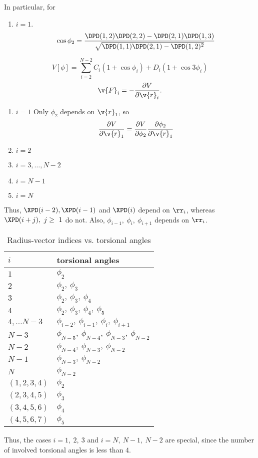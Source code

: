 In particular, for 
\begin{enumerate}
  \item $i=1$. 
    \begin{equation}
      \cos\phi_2=\frac
      {\DPD(1,2)\DPD(2,2)-\DPD(2,1)\DPD(1,3)}
      {\sqrt{\DPD(1,1)\DPD(2,1)-\DPD(1,2)^2}}
    \end{equation}
\end{enumerate}

\begin{equation}
  V[\phi]=\sum_{i=2}^{N-2}C_i(1+\cos{\phi_i})+D_i(1+\cos{3\phi_i})
\end{equation}
\begin{equation}
  \v{F}_i=-\frac{\partial V}{\partial \v{r}_i}.
\end{equation}
\begin{enumerate}
  \item $i=1$ Only $\phi_2$ depends on $\v{r}_1$, so
    \begin{equation}
      \frac{\partial V}{\partial \v{r}_1}=
      {\frac{\partial V}{\partial\phi_2}}
      {\frac{\partial\phi_2}{\partial\v{r}_1}}
    \end{equation}
  \item $i=2$
  \item $i=3,\ldots,N-2$
  \item $i=N-1$
  \item $i=N$
\end{enumerate}

Thus, $\XPD(i-2),\XPD(i-1)$ and $\XPD(i)$ depend on $\rr_i$, 
whereas $\XPD(i+j),\ j\ge\ 1$ do not. 
Also, $\phi_{i-1},\ \phi_i,\ \phi_{i+1}$ depends on $\rr_i$. 
\begin{table}
  \centering
  \caption{Radius-vector indices vs. torsional angles}
  \begin{tabular}{|p{3cm}|p{5cm}|}
\hline
$i$ 	& 	torsional angles \\
\hline
  $1$	&	$\phi_2$ \\
  $2$	&	$\phi_2,\ \phi_3$ \\
  $3$	&	$\phi_2,\ \phi_3,\ \phi_4$ \\
  $4$	&	$\phi_2,\ \phi_3,\ \phi_4,\ \phi_5$ \\
  $4,\ldots N-3$	&	$\phi_{i-2},\ \phi_{i-1},\ \phi_i,\ \phi_{i+1}$ \\
  $N-3$		& $\phi_{N-5},\ \phi_{N-4},\ \phi_{N-3},\ \phi_{N-2}$	\\
  $N-2$		& $\phi_{N-4},\ \phi_{N-3},\ \phi_{N-2}$	\\
  $N-1$		& $\phi_{N-3},\ \phi_{N-2}$			\\
  $N$		& $\phi_{N-2}$		\\
  $(1,2,3,4)$	& $\phi_2$ \\
  $(2,3,4,5)$	& $\phi_3$ \\
  $(3,4,5,6)$	& $\phi_4$ \\
  $(4,5,6,7)$	& $\phi_5$ \\
\hline
  \end{tabular}
\end{table}
Thus, the cases $i=1,\ 2,\ 3$ and $i=N,\ N-1,\ N-2$ are special, since the number
of involved torsional angles is less than $4$. 


